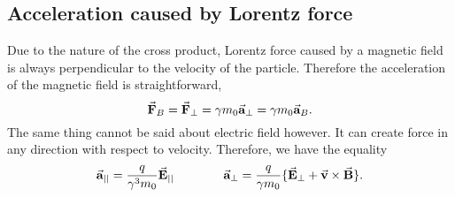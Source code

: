 \documentclass{article}
\begin{document}
\subsection{Acceleration caused by Lorentz force}
Due to the nature of the cross product, Lorentz force caused by a magnetic field is always perpendicular to the velocity of the particle. 
Therefore the acceleration of the magnetic field is straightforward,
\vspace{-10pt}
\begin{equation*}
    \vec{\textbf{F}}_B = \vec{\textbf{F}}_{\perp} = \gamma  m_0\vec{\textbf{a}}_{\perp} = \gamma  m_0\vec{\textbf{a}}_{B} .
\end{equation*}
\vspace{-10pt}
The same thing cannot be said about electric field however. 
It can create force in any direction with respect to velocity. Therefore, we have the equality
\begin{equation} \label{eq:para_and_perp_acc_of_lorentz_force}
    \begin{aligned}
        \vec{\textbf{a}}_{||} = \frac{q }{\gamma^3 m_0} \vec{\textbf{E}}_{||}
    \end{aligned}
    \qquad \qquad
    \begin{aligned}
        \vec{\textbf{a}}_{\perp} = \frac{q}{\gamma m_0} \{ \vec{\textbf{E}}_{\perp} + \vec{\textbf{v}} \times \vec{\textbf{B}}   \} .
    \end{aligned}    
\end{equation}
\end{document}
